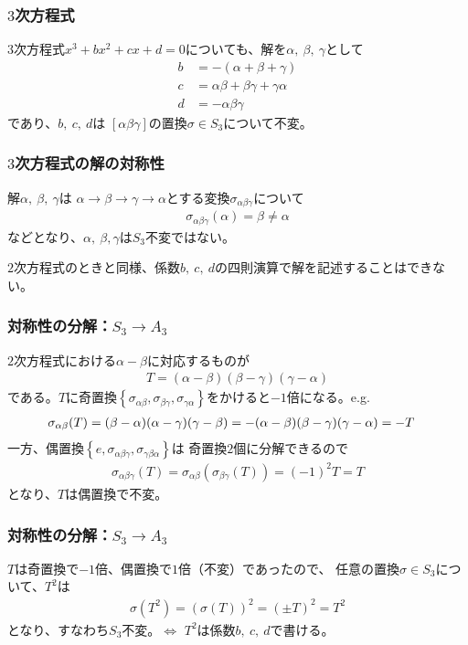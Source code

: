 \documentclass[12pt, t]{beamer}
\newcommand{\slr}[1]{\left[{}#1\right]{}}
\newcommand{\clr}[1]{\left\{{}#1\right\}{}}
\begin{document}
\begin{frame}
\frametitle{$3$次方程式}
$3$次方程式$x^3+bx^2+cx+d=0$についても、解を$\alpha,\ \beta,\ \gamma$として
\begin{align}
  b &= -(\alpha + \beta + \gamma) \\
  c &= \alpha \beta + \beta \gamma + \gamma \alpha \\
  d &= -\alpha \beta \gamma
\end{align}
であり、$b,\ c,\ d$は $\slr{\alpha \beta \gamma}$の置換$\sigma \in S_3$について不変。
\end{frame}

\begin{frame}
\frametitle{$3$次方程式の解の対称性}
解$\alpha,\ \beta,\ \gamma$は
$\alpha \rightarrow \beta \rightarrow \gamma \rightarrow \alpha$とする変換$\sigma_{\alpha \beta \gamma}$について
\begin{align}
  \sigma_{\alpha \beta \gamma}(\alpha) = \beta \neq \alpha
\end{align}
などとなり、$\alpha,\ \beta, \gamma$は$S_3$不変ではない。

$2$次方程式のときと同様、係数$b,\ c,\ d$の四則演算で解を記述することはできない。
\end{frame}

\begin{frame}
\frametitle{対称性の分解：$S_3 \rightarrow A_3$}
$2$次方程式における$\alpha - \beta$に対応するものが
\begin{align}
  T = (\alpha - \beta)(\beta - \gamma)(\gamma - \alpha)
\end{align}
である。$T$に奇置換$\clr{\sigma_{\alpha \beta}, \sigma_{\beta \gamma}, \sigma_{\gamma \alpha}}$をかけると$-1$倍になる。e.g.
\begin{align}
  \sigma_{\alpha \beta}(T) &= (\beta - \alpha)(\alpha - \gamma)(\gamma - \beta) = -(\alpha - \beta)(\beta - \gamma)(\gamma - \alpha) = -T \notag
\end{align}
一方、偶置換$\clr{e, \sigma_{\alpha \beta \gamma}, \sigma_{\gamma \beta \alpha}}$は
奇置換$2$個に分解できるので
\begin{align}
  \sigma_{\alpha \beta \gamma}(T) = \sigma_{\alpha \beta}(\sigma_{\beta \gamma}(T)) = (-1)^2 T = T
\end{align}
となり、$T$は偶置換で不変。
\end{frame}

\begin{frame}
\frametitle{対称性の分解：$S_3 \rightarrow A_3$}
$T$は奇置換で$-1$倍、偶置換で$1$倍（不変）であったので、
任意の置換$\sigma \in S_3$について、$T^2$は
\begin{align}
  \sigma(T^2) = (\sigma(T))^2 = (\pm T)^2 = T^2
\end{align}
となり、すなわち$S_3$不変。$\Leftrightarrow$ $T^2$は係数$b,\ c,\ d$で書ける。
\end{frame}
\end{document}
